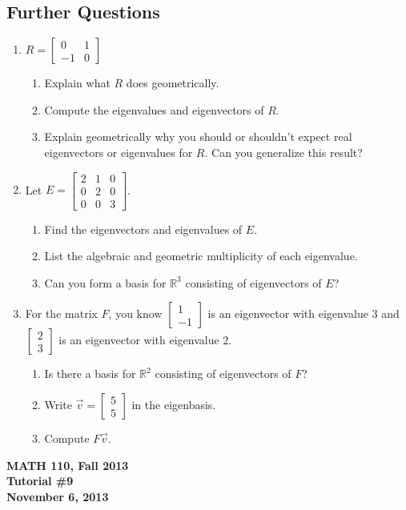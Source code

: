 \documentclass[11pt]{exam}
\newcommand{\R}{\mathbb{R}}
\newcommand{\mat}[1]{\begin{bmatrix}#1\end{bmatrix}}
\newcommand{\mthCourse}{MATH 110}
\newcommand{\mthTerm}{Fall 2013}
\newcommand{\mthTutorialNumber}{9}
\newcommand{\mthDate}{November 6, 2013}
\begin{document}
\subsection*{Further Questions}
\begin{enumerate}[resume]
	
	\item $R=\mat{0&1\\-1&0}$
	\begin{enumerate}
		\item Explain what $R$ does geometrically.
		\item Compute the eigenvalues and eigenvectors of $R$.
		\item Explain geometrically why you should or shouldn't expect real eigenvectors
			or eigenvalues for $R$.  Can you generalize this result?
	\end{enumerate}
	\item 
	Let $E=\mat{2&1&0\\0&2&0\\0&0&3}$.
		\begin{enumerate}
			\item Find the eigenvectors and eigenvalues of $E$.
			\item List the algebraic and geometric multiplicity of each eigenvalue.
			\item Can you form a basis for $\R^3$ consisting of eigenvectors
				of $E$?
		\end{enumerate}
	\item For the matrix $F$, you know $\mat{1\\-1}$ is an eigenvector
		with eigenvalue $3$ and $\mat{2\\3}$ is an eigenvector with eigenvalue
		$2$.
		\begin{enumerate}
			\item Is there a basis for $\R^2$ consisting of eigenvectors of $F$?
			\item Write $\vec v=\mat{5\\5}$ in the eigenbasis.
			\item Compute $F\vec v$.
		\end{enumerate}
\end{enumerate}




\newpage
{
	\begin{center}
		{\bf \mthCourse, \mthTerm}\\ 
		{\bf Tutorial \#\mthTutorialNumber}\\
		{\bf \mthDate}
	\end{center}
}
\end{document}
